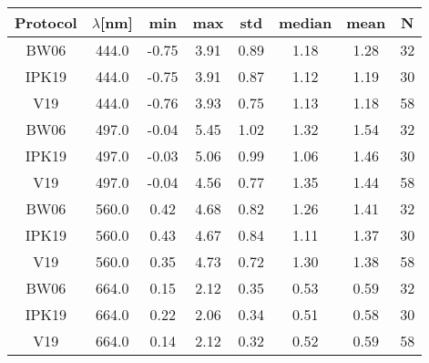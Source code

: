 \documentclass[preview]{standalone}
\begin{document}
\begin{table}
\begin{tabular}{cccccccc}\hline
Protocol & $\lambda$[nm] & min & max & std & median & mean & N\\\hline
BW06 & 444.0 & -0.75 & 3.91 & 0.89 & 1.18 & 1.28 & 32\\
IPK19 & 444.0 & -0.75 & 3.91 & 0.87 & 1.12 & 1.19 & 30\\
V19 & 444.0 & -0.76 & 3.93 & 0.75 & 1.13 & 1.18 & 58\\\hline

BW06 & 497.0 & -0.04 & 5.45 & 1.02 & 1.32 & 1.54 & 32\\
IPK19 & 497.0 & -0.03 & 5.06 & 0.99 & 1.06 & 1.46 & 30\\
V19 & 497.0 & -0.04 & 4.56 & 0.77 & 1.35 & 1.44 & 58\\\hline

BW06 & 560.0 & 0.42 & 4.68 & 0.82 & 1.26 & 1.41 & 32\\
IPK19 & 560.0 & 0.43 & 4.67 & 0.84 & 1.11 & 1.37 & 30\\
V19 & 560.0 & 0.35 & 4.73 & 0.72 & 1.30 & 1.38 & 58\\\hline

BW06 & 664.0 & 0.15 & 2.12 & 0.35 & 0.53 & 0.59 & 32\\
IPK19 & 664.0 & 0.22 & 2.06 & 0.34 & 0.51 & 0.58 & 30\\
V19 & 664.0 & 0.14 & 2.12 & 0.32 & 0.52 & 0.59 & 58\\\hline



\end{tabular}
\end{table}
\end{document}
